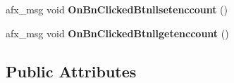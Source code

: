 \begin{DoxyCompactItemize}
\item 
afx\+\_\+msg void {\bfseries On\+Bn\+Clicked\+Btnllsetenccount} ()\hypertarget{class_c_a_p_t_d_l_l_client_dlg_af844bf02c878da6121a148d8b58dedc8}{}\label{class_c_a_p_t_d_l_l_client_dlg_af844bf02c878da6121a148d8b58dedc8}

\item 
afx\+\_\+msg void {\bfseries On\+Bn\+Clicked\+Btnllgetenccount} ()\hypertarget{class_c_a_p_t_d_l_l_client_dlg_a3b8a4f2dfcced1bcefdefef0ccc96b5b}{}\label{class_c_a_p_t_d_l_l_client_dlg_a3b8a4f2dfcced1bcefdefef0ccc96b5b}

\end{DoxyCompactItemize}
\subsection*{Public Attributes}
